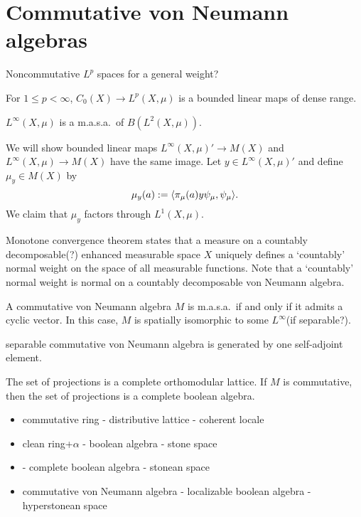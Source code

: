 \documentclass{../../large}
\begin{document}
\section{Commutative von Neumann algebras}

\begin{prb}
Noncommutative $L^p$ spaces for a general weight?
\begin{parts}
\item For $1\le p<\infty$, $C_0(X)\to L^p(X,\mu)$ is a bounded linear maps of dense range.
\item $L^\infty(X,\mu)$ is a m.a.s.a.~of $B(L^2(X,\mu))$.
\end{parts}
\end{prb}
\begin{pf}
We will show bounded linear maps $L^\infty(X,\mu)'\to M(X)$ and $L^\infty(X,\mu)\to M(X)$ have the same image.
Let $y\in L^\infty(X,\mu)'$ and define $\mu_y\in M(X)$ by
\[\mu_y(a):=\langle\pi_\mu(a)y\psi_\mu,\psi_\mu\rangle.\]
We claim that $\mu_y$ factors through $L^1(X,\mu)$.
\end{pf}

Monotone convergence theorem states that a measure on a countably decomposable(?) enhanced measurable space $X$ uniquely defines a `countably' normal weight on the space of all measurable functions.
Note that a `countably' normal weight is normal on a countably decomposable von Neumann algebra.



\begin{prb}
A commutative von Neumann algebra $M$ is m.a.s.a.~if and only if it admits a cyclic vector.
In this case, $M$ is spatially isomorphic to some $L^\infty$(if separable?).
\end{prb}
\begin{pf}
\end{pf}

separable commutative von Neumann algebra is generated by one self-adjoint element.





\begin{prb}
The set of projections is a complete orthomodular lattice.
If $M$ is commutative, then the set of projections is a complete boolean algebra.
\end{prb}

\begin{itemize}
\item commutative ring - distributive lattice - coherent locale
\item clean ring+$\alpha$ - boolean algebra - stone space
\item - complete boolean algebra - stonean space
\item commutative von Neumann algebra - localizable boolean algebra - hyperstonean space
\end{itemize}
\end{document}
